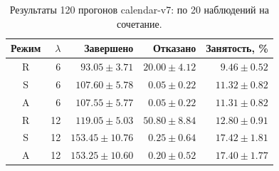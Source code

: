 \begin{table}[H]\centering\small
\setlength{\tabcolsep}{3pt}
\begin{tabular}{crrrr}
\toprule
Режим & $\lambda$ & Завершено & Отказано & Занятость, \% \\
\midrule
R & 6 & $93.05\pm3.71$ & $20.00\pm4.12$ & $9.46\pm0.52$ \\
S & 6 & $107.60\pm5.78$ & $0.05\pm0.22$ & $11.32\pm0.82$ \\
A & 6 & $107.55\pm5.77$ & $0.05\pm0.22$ & $11.31\pm0.82$ \\
R & 12 & $119.05\pm5.03$ & $50.80\pm8.84$ & $12.80\pm0.91$ \\
S & 12 & $153.45\pm10.76$ & $0.25\pm0.64$ & $17.42\pm1.81$ \\
A & 12 & $153.25\pm10.60$ & $0.20\pm0.52$ & $17.40\pm1.77$ \\
\bottomrule
\end{tabular}
\caption{Результаты 120 прогонов calendar-v7: по 20 наблюдений на сочетание.}
\end{table}
